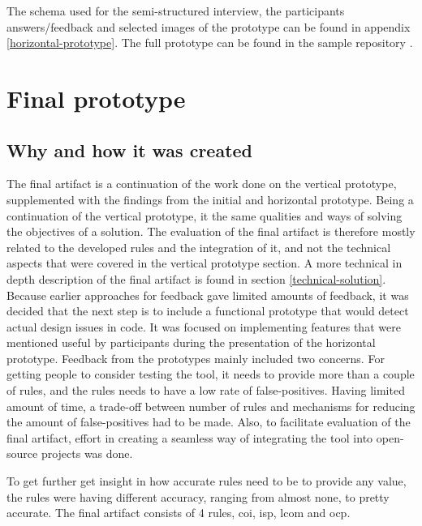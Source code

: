 \documentclass{report}
\begin{document}
The schema used for the semi-structured interview, the participants answers/feedback and selected images of the prototype can be found in appendix \ref{horizontal-prototype}. The full prototype can be found in the sample repository \cite{sample-repository}. 



\section{Final prototype}

\subsection*{Why and how it was created}
The final artifact is a continuation of the work done on the vertical prototype, supplemented with the findings from the initial and horizontal prototype. Being a continuation of the vertical prototype, it the same qualities and ways of solving the objectives of a solution. The evaluation of the final artifact is therefore mostly related to the developed rules and the integration of it, and not the technical aspects that were covered in the vertical prototype section. A more technical in depth description of the final artifact is found in section \ref{technical-solution}. Because earlier approaches for feedback gave limited amounts of feedback, it was decided that the next step is to include a functional prototype that would detect actual design issues in code. It was focused on implementing features that were mentioned useful by participants during the presentation of the horizontal prototype. Feedback from the prototypes mainly included two concerns. For getting people to consider testing the tool, it needs to provide more than a couple of rules, and the rules needs to have a low rate of false-positives. Having limited amount of time, a trade-off between number of rules and mechanisms for reducing the amount of false-positives had to be made. Also, to facilitate evaluation of the final artifact, effort in creating a seamless way of integrating the tool into open-source projects was done. 

To get further get insight in how accurate rules need to be to provide any value, the rules were having different accuracy, ranging from almost none, to pretty accurate. The final artifact consists of 4 rules, \gls{coi}, \gls{isp}, \gls{lcom} and \gls{ocp}. 
\end{document}
